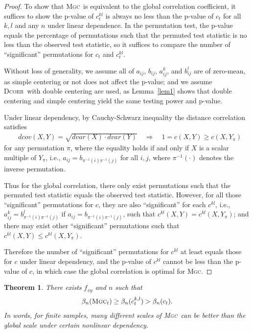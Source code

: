 \documentclass[11pt]{article}
\providecommand{\sct}[1]{{\normalfont\textsc{#1}}}
\newcommand{\G}{c}
\newcommand{\Mgc}{\sct{Mgc}}
\newcommand{\Dcorr}{\sct{Dcorr}}
\newtheorem{appThm}{Theorem}
\begin{document}
\begin{proof}
To show that \Mgc~is equivalent to the global correlation coefficient, it suffices to show the p-value of $\G^{kl}_t$ is always no less than the p-value of $\G_t$ for all $k,l$ and any $n$ under linear dependence. In the permutation test, the p-value equals the percentage of permutations such that the permuted test statistic is no less than the observed test statistic, so it suffices to compare the number of ``significant'' permutations for $\G_t$ and $\G^{kl}_t$.

Without loss of generality, we assume all of $a_{ij}$, $b_{ij}$, $a_{ij}^{k}$, and $b_{ij}^{l}$ are of zero-mean, as simple centering or not does not affect the p-value; and we assume \Dcorr~with double centering are used, as Lemma~\ref{lem1} shows that double centering and simple centering yield the same testing power and p-value.

Under linear dependency, by Cauchy-Schwarz inequality the distance correlation satisfies
\begin{align*}
& dcov(X,Y) = \sqrt{dvar(X) \cdot dvar(Y)} \quad\Rightarrow\quad 1=\G(X, Y) \geq \G(X, Y_{\pi})
\end{align*}
for any permutation $\pi$, where the equality holds if and only if $X$ is a scalar multiple of $Y_{\pi}$, i.e., $a_{ij}=b_{\pi^{-1}(i) \pi^{-1}(j)}$ for all $i,j$, where $\pi^{-1}(\cdot)$ denotes the inverse permutation. %

Thus for the global correlation, there only exist permutations such that the permuted test statistic equals the observed test statistic. However, for all those ``significant'' permutations for $\G$, they are also ``significant'' for each $\G^{kl}$, i.e., $a_{ij}^{k}=b_{\pi^{-1}(i) \pi^{-1}(j)}^{l}$ if $a_{ij}=b_{\pi^{-1}(i) \pi^{-1}(j)}$, such that $\G^{kl}(X, Y)=\G^{kl}(X, Y_{\pi})$; and there may exist other ``significant'' permutations such that $\G^{kl}(X, Y) \leq \G^{kl}(X, Y_{\pi})$.

Therefore the number of ``significant'' permutations for $\G^{kl}$ at least equals those for $\G$ under linear dependency, and the p-value of $\G^{kl}$ cannot be less than the p-value of $\G$, in which case the global correlation is optimal for \Mgc. 

\end{proof}

\begin{appThm}
There exists $f_{xy}$ and $n$ such that
\begin{equation}
\beta_n(\Mgc_{t}) \geq \beta_n(\G^{k,l}_{t}) > \beta_n(\G_{t}).
\end{equation}
In words, for finite samples, many different scales of \Mgc~can be better than the global scale under certain nonlinear dependency.
\end{appThm}
\end{document}
